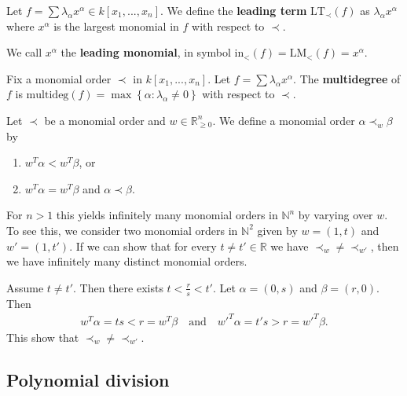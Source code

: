 \documentclass[a4paper, 11pt]{article}
\begin{document}


\begin{defi}
  Let \( f = \sum \lambda_\alpha x^\alpha \in k[x_1,...,x_n] \). We define the \textbf{leading term} \( \mathrm{LT}_{\prec}(f) \) as \( \lambda_\alpha x^\alpha \) where \( x^\alpha \) is the largest monomial in \( f \) with respect to \( \prec \). 
  
  We call \( x^\alpha \) the \textbf{leading monomial}, in symbol \( \mathrm{in}_<(f) = \mathrm{LM}_<(f) = x^\alpha \).
\end{defi}

\begin{defi}[Multidegree]
  Fix a monomial order \( \prec \) in \( k[x_1,...,x_n] \).
  Let \( f = \sum \lambda_\alpha x^\alpha \). The \textbf{multidegree} of \( f \) is \( \mathrm{multideg}(f) = \max \left\{ \alpha : \lambda_\alpha \neq 0 \right\} \) with respect to \( \prec \).
\end{defi}

\begin{remark}
  Let \( \prec \) be a monomial order and \( w \in \mathbb R^n_{\geq 0} \). We define a monomial order \( \alpha \prec_w \beta \) by
\begin{enumerate}
  \item \( w^T\alpha < w^T\beta \), or
  \item \( w^T \alpha = w^T \beta \) and \( \alpha \prec \beta \).
\end{enumerate}
For \( n > 1 \) this yields infinitely many monomial orders in \( \mathbb N^n \) by varying over \( w \). To see this, we consider two monomial orders in \( \mathbb N^2 \) given by \( w = (1,t) \) and \( w' = (1, t') \). If we can show that for every \( t \neq t' \in \mathbb R \) we have \(  \prec_w \neq \prec_{w'} \), then we have infinitely many distinct monomial orders. 

Assume \( t \neq t' \). Then there exists \( t < \frac{r}{s} < t' \). Let \( \alpha = (0,s) \) and \( \beta = (r,0) \). Then 
\begin{align*}
  w^T\alpha = ts < r = w^T\beta \quad \text{and} \quad w'^T \alpha = t's > r = w'^T \beta.
\end{align*}
This show that \( \prec_w \neq \prec_{w'} \).
\end{remark}


\subsection{Polynomial division}
\end{document}

